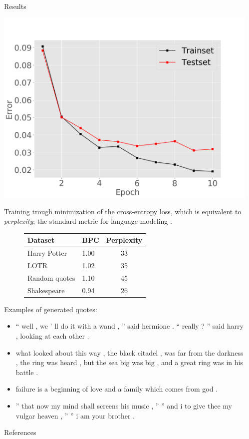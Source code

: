 \documentclass[final]{beamer}
\newcommand{\compresslist}{
  \setlength{\itemsep}{1pt}
  \setlength{\parskip}{0pt}
  \setlength{\parsep}{0pt}}
\newlength{\sepwidth}
\newlength{\colwidth}
\newcommand{\separatorcolumn}{\begin{column}{\sepwidth}\end{column}}
\begin{document}
\begin{frame}[t]
\begin{columns}[t]
\begin{column}{\colwidth}
\begin{block}{Results}
 \begin{center}
	\includegraphics[width=.7\linewidth]{classerror}
\end{center}

Training trough minimization of the cross-entropy loss, which is equivalent to
\textit{perplexity}; the standard metric for language
modeling \cite{gravesGenerating}.
\begin{figure}[htbp!]
\begin{tabular}{|l|l|c|}
\hline
Dataset & BPC & Perplexity \\
\hline
Harry Potter & 1.00 & 33 \\
LOTR & 1.02 & 35 \\
Random quotes & 1.10 & 45 \\
Shakespeare & 0.94 & 26\\
\hline
\end{tabular}
\end{figure}

Examples of generated quotes:
\begin{itemize}\compresslist
    \item `` well , we ' ll do it with a wand , '' said hermione . `` really ?
      '' said harry , looking at each other .
    \item  what looked about this
      way , the black citadel , was far from the
          darkness , the ring was heard , but the sea big was big , and a great
          ring was in his battle .
    \item failure is a beginning of love and a family which comes from god .
    \item  '' that now my mind shall screens his music , '' '' and i to give
      thee my vulgar heaven , '' '' i am your brother .
\end{itemize}
\end{block}
\begin{block}{References}
\printbibliography
\end{block}
\end{column}
\separatorcolumn
\end{columns}
\end{frame}
\end{document}
